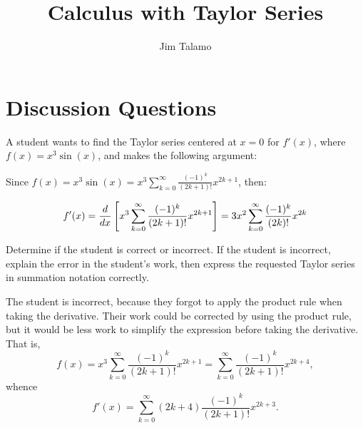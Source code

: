 \documentclass[noauthor,handout]{ximera}
\author{Jim Talamo}
\title{Calculus with Taylor Series}
\begin{document}
\begin{abstract}
\end{abstract}
\maketitle

\vspace{-0.9in}

\section{Discussion Questions}

\begin{problem} 

A student wants to find the Taylor series centered at $x=0$ for $f'(x)$, where $f(x) = x^3 \sin(x)$, and makes the following argument:

Since $f(x) = x^3 \sin(x) = x^3 \sum_{k=0}^{\infty} \frac{(-1)^k}{(2k+1)!}x^{2k+1}$, then:

\begin{align*}
f'(x) = \frac{d}{\mathop{}\!d x} \left[  x^3 \sum_{k=0}^{\infty} \frac{(-1)^k}{(2k+1)!}x^{2k+1} \right] &=  3x^2 \sum_{k=0}^{\infty} \frac{(-1)^k}{(2k)!}x^{2k} \\ 
\end{align*}

Determine if the student is correct or incorrect.  If the student is incorrect, explain the error in the student's work, then express the requested Taylor series in summation notation correctly.

\begin{freeResponse}
The student is incorrect, because they forgot to apply the product rule when taking the derivative. Their work could be corrected by using the product rule, but it would be less work to simplify the expression before taking the derivative. That is,
$$
f(x) = x^3 \sum_{k=0}^{\infty} \frac{(-1)^k}{(2k+1)!}x^{2k+1} = \sum_{k=0}^\infty \frac{(-1)^k}{(2k+1)!}x^{2k+4},
$$
whence
$$
f'(x) = \sum_{k=0}^\infty (2k+4)\frac{(-1)^k}{(2k+1)!}x^{2k+3}.
$$
\end{freeResponse}
\end{problem}
\end{document}
